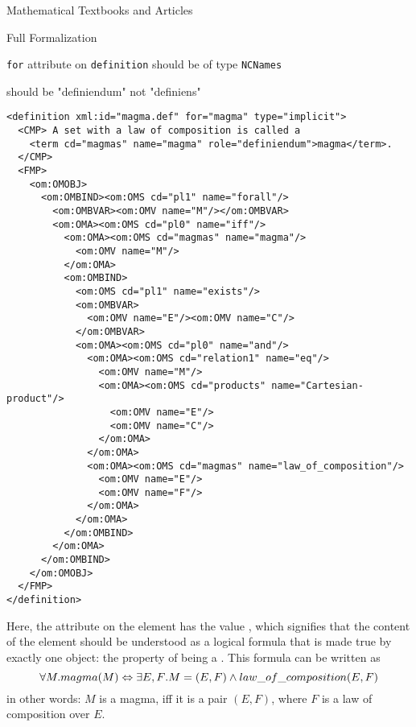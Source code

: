 \begin{tchapter}[id=algebra,short=Textbooks and Articles]{Mathematical Textbooks and Articles}
\begin{tsection}[id=formalization]{Full Formalization}
\begin{erratum}[reported-by=Michael Kohlhase,date=2009-08-11]{{\texttt{for}} attribute on
    {\texttt{definition}} should be of type {\texttt{NCNames}}}
\begin{erratum}[reported-by=Krzysztof Retel,date=2006-09-14]{should be "definiendum" not "definiens"}
\begin{lstlisting}[label=lst:magma:formal,
    caption={The formal definition of a magma},
    index={definition,CMP,FMP,OMOBJ,OMS,OMA,OMV}]
 <definition xml:id="magma.def" for="magma" type="implicit">
  <CMP> A set with a law of composition is called a 
    <term cd="magmas" name="magma" role="definiendum">magma</term>.
  </CMP>
  <FMP>
    <om:OMOBJ>
      <om:OMBIND><om:OMS cd="pl1" name="forall"/>
        <om:OMBVAR><om:OMV name="M"/></om:OMBVAR>
        <om:OMA><om:OMS cd="pl0" name="iff"/>
          <om:OMA><om:OMS cd="magmas" name="magma"/>
            <om:OMV name="M"/>
          </om:OMA>
          <om:OMBIND>
            <om:OMS cd="pl1" name="exists"/>
            <om:OMBVAR>
              <om:OMV name="E"/><om:OMV name="C"/>
            </om:OMBVAR>
            <om:OMA><om:OMS cd="pl0" name="and"/>
              <om:OMA><om:OMS cd="relation1" name="eq"/>
                <om:OMV name="M"/>
                <om:OMA><om:OMS cd="products" name="Cartesian-product"/>
                  <om:OMV name="E"/>
                  <om:OMV name="C"/>
                </om:OMA>
              </om:OMA>
              <om:OMA><om:OMS cd="magmas" name="law_of_composition"/>
                <om:OMV name="E"/>
                <om:OMV name="F"/>
              </om:OMA>
            </om:OMA>
          </om:OMBIND>
        </om:OMA>
      </om:OMBIND>
    </om:OMOBJ>
  </FMP>
</definition>
\end{lstlisting}
\end{erratum}
\end{erratum}

\noindent Here, the {} attribute on the
{} element has the value
{}, which signifies that the
content of the {} element should be understood as a
logical formula that is made true by exactly one object: the
property of being a {}. This formula can be written
as
\[{\forall{M}.{magma(M)\Leftrightarrow{\exists{E,F}.{M=(E,F)\land law\_of\_composition(E,F)}}}}\]
in other words: $M$ is a magma, iff it is a pair $(E,F)$, where $F$ is a law of
composition over $E$.


\end{tsection}
\end{tchapter}
